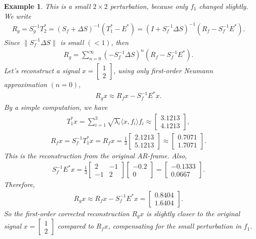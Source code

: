 \documentclass[12pt,titlepage]{amsart}
\newtheorem{exam}[thm]{Example}
\theoremstyle{definition}
\theoremstyle{remark}
\begin{document}
\begin{exam}
This is a small $2 \times 2$ perturbation, because only $f_1$
changed slightly. We write
\begin{eqnarray*}
R_g = S_g^{-1} T_2^* = (S_f + \Delta S)^{-1} (T_1^* - E^*) = (I +
S_f^{-1} \Delta S)^{-1} (R_f - S_f^{-1} E^*).
\end{eqnarray*}
Since $\|S_f^{-1} \Delta S\|$ is small $(<1)$, then
\begin{eqnarray*}
R_g = \sum_{n=0}^{\infty} (-S_f^{-1} \Delta S)^n (R_f - S_f^{-1}
E^*).
\end{eqnarray*}
Let's reconstruct a signal $x = \begin{bmatrix} 1 \\ 2
\end{bmatrix}$, using only first-order Neumann approximation $(n=0)$,
\begin{eqnarray*}
R_g x \approx R_f x - S_f^{-1} E^* x.
\end{eqnarray*}
By a simple computation, we have
\begin{eqnarray*}
T_1^* x = \sum_{i=1}^3 \sqrt{\lambda_i} \langle x, f_i \rangle f_i
\approx \begin{bmatrix}3.1213 \\
4.1213\end{bmatrix},
\end{eqnarray*}
\begin{eqnarray*}
R_f x = S_f^{-1} T_1^* x =  R_f x = \frac{1}{3}
\begin{bmatrix}2.1213 \\ 5.1213\end{bmatrix} \approx
\begin{bmatrix}0.7071 \\ 1.7071\end{bmatrix}.
\end{eqnarray*}
This is the reconstruction from the original $AR$-frame. Also,
\begin{eqnarray*}
S_f^{-1} E^* x = \frac{1}{3} \begin{bmatrix}2 & -1 \\ -1 &
2\end{bmatrix} \begin{bmatrix}-0.2 \\ 0\end{bmatrix} =
\begin{bmatrix}-0.1333
\\ 0.0667\end{bmatrix}.
\end{eqnarray*}
Therefore,
\begin{eqnarray*}
R_g x \approx R_f x - S_f^{-1} E^* x =
\begin{bmatrix}0.8404 \\ 1.6404\end{bmatrix}.
\end{eqnarray*}
So the first-order corrected reconstruction $R_g x$ is slightly
closer to the original signal $x = \begin{bmatrix}1
\\ 2\end{bmatrix}$ compared to $R_f x$, compensating for the
small perturbation in $f_1$.
\end{exam}
\end{document}
